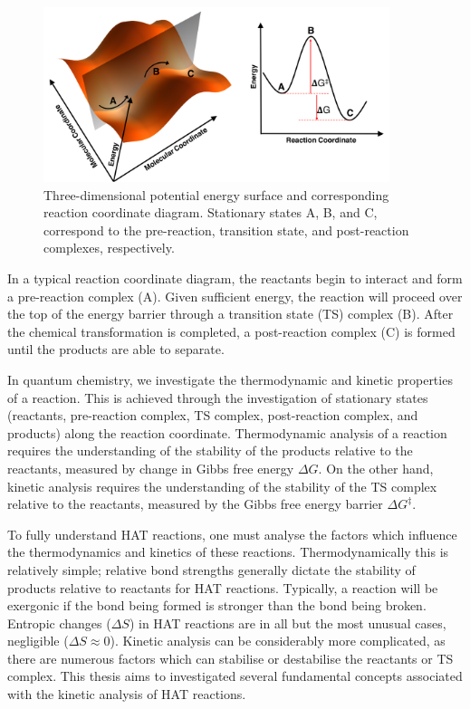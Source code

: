 {\begin{figure}[htb]
  \centering
  \includegraphics[width=0.9\textwidth]{figures/pes-1}
  \caption[Three-dimensional potential energy surface and corresponding reaction coordinate diagram.]{Three-dimensional potential energy surface and corresponding reaction coordinate diagram. Stationary states A, B, and C, correspond to the pre-reaction, transition state, and post-reaction complexes, respectively.}
\label{fig:pes}
\end{figure}

\noindent In a typical reaction coordinate diagram, the reactants begin to interact and form a pre-reaction complex (A). Given sufficient energy, the reaction will proceed over the top of the energy barrier through a transition state (TS) complex (B). After the chemical transformation is completed, a post-reaction complex (C) is formed until the products are able to separate.

In quantum chemistry, we investigate the thermodynamic and kinetic properties of a reaction. This is achieved through the investigation of stationary states (reactants, pre-reaction complex, TS complex, post-reaction complex, and products) along the reaction coordinate. Thermodynamic analysis of a reaction requires the understanding of the stability of the products relative to the reactants, measured by change in Gibbs free energy $\Delta G$. On the other hand, kinetic analysis requires the understanding of the stability of the TS complex relative to the reactants, measured by the Gibbs free energy barrier $\Delta G^{\ddagger}$.

To fully understand HAT reactions, one must analyse the factors which influence the thermodynamics and kinetics of these reactions. Thermodynamically this is relatively simple; relative bond strengths generally dictate the stability of products relative to reactants for HAT reactions. Typically, a reaction will be exergonic if the bond being formed is stronger than the bond being broken. Entropic changes ($\Delta S$) in HAT reactions are in all but the most unusual cases, negligible ($\Delta S \approx 0$).\cite{Mader2007} Kinetic analysis can be considerably more complicated, as there are numerous factors which can stabilise or destabilise the reactants or TS complex. This thesis aims to investigated several fundamental concepts associated with the kinetic analysis of HAT reactions.

}
